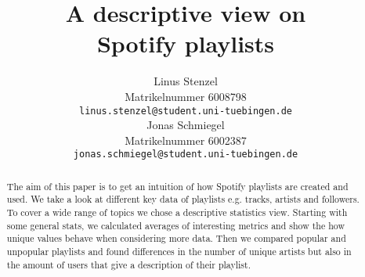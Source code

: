 \documentclass{article}
\title{A descriptive view on\\ Spotify playlists}
\author{
  Linus Stenzel\\
  Matrikelnummer 6008798\\
  \texttt{linus.stenzel@student.uni-tuebingen.de} \\
  \And
  Jonas Schmiegel\\
  Matrikelnummer 6002387\\
  \texttt{jonas.schmiegel@student.uni-tuebingen.de} \\
}
\begin{document}
\maketitle

\begin{abstract}
  The aim of this paper is to get an intuition of how Spotify playlists are created and used. We take a look at different key data of playlists e.g. tracks, artists and followers. To cover a wide range of topics we chose a descriptive statistics view. Starting with some general stats, we calculated averages of interesting metrics and show the how unique values behave when considering more data. Then we compared popular and unpopular playlists and found differences in the number of unique artists but also in the amount of users that give a description of their playlist.
  
\end{abstract}







% 
\end{document}
